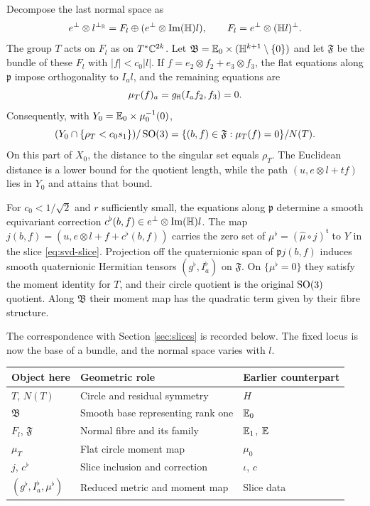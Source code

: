 Decompose the last normal space as
\[
 e^\perp\otimes l^{\perp_{\mathbb R}}
 =F_l\oplus(e^\perp\otimes\operatorname{Im}(\mathbb H)l),
 \qquad F_l=e^\perp\otimes(\mathbb H l)^\perp.
\]
The group $T$ acts on $F_l$ as on $T^*\mathbb C^{2k}$. Let
$\mathfrak B=\mathbb E_0\times(\mathbb H^{k+1}\setminus\{0\})$ and let
$\mathfrak F$ be the bundle of these $F_l$ with $|f|<c_0|l|$.
If $f=e_2\otimes f_2+e_3\otimes f_3$, the flat equations
along $\mathfrak p$ impose orthogonality to $I_al$, and the
remaining equations are
\[
 \mu_T(f)_a=g_{\mathrm{fl}}(I_af_2,f_3)=0.
\]
Consequently, with $Y_0=\mathbb E_0\times\mu_0^{-1}(0)$,
\begin{equation}\label{eq:zero-slice}
 (Y_0\cap\{\rho_T<c_0s_1\})/\operatorname{SO}(3)
 =\{(b,f)\in\mathfrak F:\mu_T(f)=0\}/N(T).
\end{equation}
On this part of $X_0$, the distance to the singular set equals
$\rho_T$. The Euclidean distance is a lower bound for the
quotient length, while the path
$(u,e\otimes l+tf)$ lies in $Y_0$ and attains that bound.

\begin{lemma}\label{lem:reduced-data}
For $c_0<1/\sqrt2$ and $r$ sufficiently small, the equations
along $\mathfrak p$ determine a smooth equivariant correction
$c^\flat(b,f)\in e^\perp\otimes\operatorname{Im}(\mathbb H)l$.
The map
$j(b,f)=(u,e\otimes l+f+c^\flat(b,f))$ carries the zero set
of $\mu^\flat=(\widehat\mu\circ j)^{\mathfrak t}$ to $Y$
in the slice \eqref{eq:svd-slice}. Projection off the
quaternionic span of $\mathfrak p j(b,f)$ induces smooth
quaternionic Hermitian tensors $(g^\flat,I_a^\flat)$ on
$\mathfrak F$. On $\{\mu^\flat=0\}$ they satisfy the moment
identity for $T$, and their circle quotient is the original
$\operatorname{SO}(3)$ quotient. Along $\mathfrak B$ their moment map has
the quadratic term given by their fibre structure.
\end{lemma}

The correspondence with Section \ref{sec:slices} is recorded
below. The fixed locus is now the base of a bundle, and the
normal space varies with $l$.
\begin{center}
\begin{tabular}{lp{}l}
\toprule
Object here & Geometric role & Earlier counterpart\\
\midrule
$T$, $N(T)$ & Circle and residual symmetry & $H$\\
$\mathfrak B$ & Smooth base representing rank one & $\mathbb E_0$\\
$F_l$, $\mathfrak F$ & Normal fibre and its family & $\mathbb E_1$, $\mathbb E$\\
$\mu_T$ & Flat circle moment map & $\mu_0$\\
$j$, $c^\flat$ & Slice inclusion and correction & $\iota$, $c$\\
$(g^\flat,I_a^\flat,\mu^\flat)$ & Reduced metric and moment map & Slice data\\
\bottomrule
\end{tabular}
\end{center}

